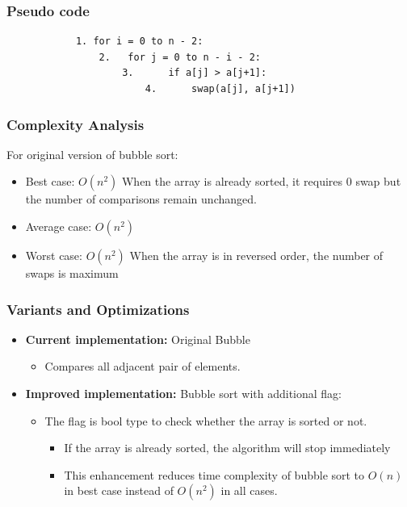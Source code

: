     \subsubsection{Pseudo code} 
        \begin{verbatim}
            1. for i = 0 to n - 2:
                2.   for j = 0 to n - i - 2:
                    3.      if a[j] > a[j+1]:
                        4.      swap(a[j], a[j+1])
        \end{verbatim}


    \subsubsection{Complexity Analysis}
        For original version of bubble sort:
        \begin{itemize}
            \item  Best case: $O(n^2)$
            \subitem When the array is already sorted, it requires 0 swap but the number of comparisons remain unchanged.
            \item Average case: $O(n^2)$
            \item Worst case: $O(n^2)$
            \subitem When the array is in reversed order, the number of swaps is maximum
        \end{itemize}
    

    \subsubsection{Variants and Optimizations} 
    \begin{itemize}
        \item \textbf{Current implementation: } Original Bubble 
            \begin{itemize}
                \item Compares all adjacent pair of elements.
            \end{itemize}
        \item \textbf{Improved implementation: } Bubble sort with additional flag:
         \begin{itemize}
            \item The flag is bool type to check whether the array is sorted or not.
            \begin{itemize}
                \item If the array is already sorted, the algorithm will stop immediately
                \item This enhancement reduces time complexity of bubble sort to $O(n)$ in best case instead of $O(n^2) $ in all cases.
            \end{itemize}
         \end{itemize}
    \end{itemize}

